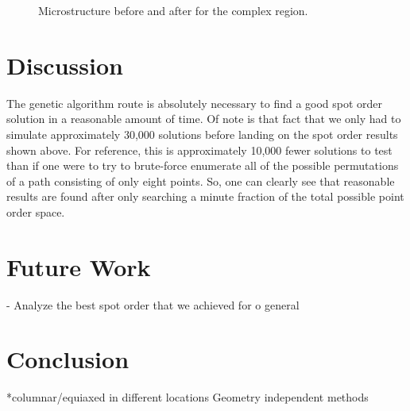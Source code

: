 \documentclass[a4paper]{article}
\begin{document}
\begin{figure}
\centering
{}
\caption{\label{fig:resultleaf}Microstructure before and after for the complex region.}
\end{figure}


\section{Discussion}
\label{sec:discussion}

The genetic algorithm route is absolutely necessary to find a good spot order solution in a reasonable amount of time. Of note is that fact that we only had to simulate approximately 30,000 solutions before landing on the spot order results shown above. For reference, this is approximately 10,000 fewer solutions to test than if one were to try to brute-force enumerate all of the possible permutations of a path consisting of only eight points. So, one can clearly see that reasonable results are found after only searching a minute fraction of the total possible point order space. 


\section{Future Work}
\label{sec:futurework}

-	Analyze the best spot order that we achieved for
o	general


\section{Conclusion}
\label{sec:conclusion}

*columnar/equiaxed in different locations
Geometry independent methods



\end{document}
